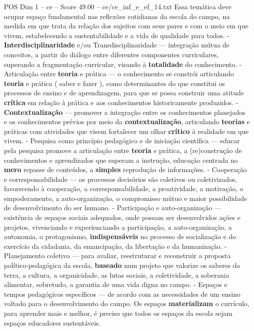 \begin{textsample}{POS Dim 1 – ce – Score 49.00 – ce/ce\_inf\_e\_ef\_14.txt}
Essa temática deve ocupar espaço fundamental nas reflexões cotidianas da escola do campo, na medida em que trata da relação dos sujeitos com seus pares e com o meio em que vivem, estabelecendo a sustentabilidade e a vida de qualidade para todos. - \textbf{Interdisciplinaridade} e/ou Transdisciplinaridade — integração mútua de conceitos, a partir do diálogo entre diferentes componentes curriculares, superando a fragmentação curricular, visando à \textbf{totalidade} do conhecimento. - Articulação entre \textbf{teoria} e prática — o conhecimento se constrói articulando \textbf{teoria} e prática ( saber e fazer ), como determinantes do que constitui os processos de ensino e de aprendizagem, para que se possa construir uma atitude \textbf{crítica} em relação à prática e aos conhecimentos historicamente produzidos. - \textbf{Contextualização} — promover a integração entre os conhecimentos planejados e os conhecimentos prévios por meio da \textbf{contextualização}, articulando \textbf{teorias} e práticas com atividades que visem fortalecer um olhar \textbf{crítico} à realidade em que vivem. - Pesquisa como princípio pedagógico e de iniciação científica — educar pela pesquisa promove a articulação entre \textbf{teoria} e prática, a (re)construção de conhecimentos e aprendizados que superam a instrução, educação centrada no \textbf{mero} repasse de conteúdos, a \textbf{simples} reprodução de informações. - Cooperação e corresponsabilidade — os processos decisórios são coletivos ou coletivizados, favorecendo à cooperação, a corresponsabilidade, a proatividade, a motivação, o empoderamento, a auto-organização, o compromisso mútuo e maior possibilidade de desenvolvimento do ser humano. - Participação e auto-organização — existência de espaços sociais adequados, onde possam ser desenvolvidos ações e projetos, vivenciando e experienciando a participação, a auto-organização, a autonomia, o protagonismo, \textbf{indispensáveis} no processo de socialização e do exercício da cidadania, da emancipação, da libertação e da humanização. - Planejamento coletivo — para avaliar, reestruturar e reconstruir a proposta político-pedagógica da escola, \textbf{baseado} num projeto que valorize os saberes da terra, a cultura, a organicidade, as lutas sociais, a coletividade, a soberania alimentar, sobretudo, a garantia de uma vida digna no campo. - Espaços e tempos pedagógicos específicos — de acordo com as necessidades de um ensino voltado para o desenvolvimento do campo.
Os espaços \textbf{materializam} o currículo, para aprender mais e melhor, é preciso que todos os espaços da escola sejam espaços educadores sustentáveis.

\end{textsample}
